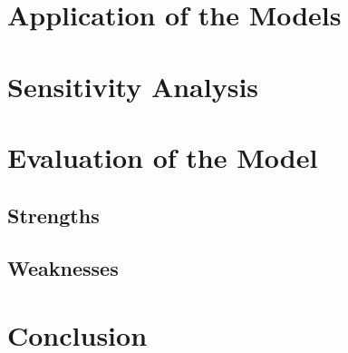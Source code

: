 \documentclass{HZNUMCM}
\begin{document}

  \section{Application of the Models}

  \section{Sensitivity Analysis}

  \section{Evaluation of the Model}
    \subsection{Strengths}
    \subsection{Weaknesses}

  \section{Conclusion}


\end{document}
